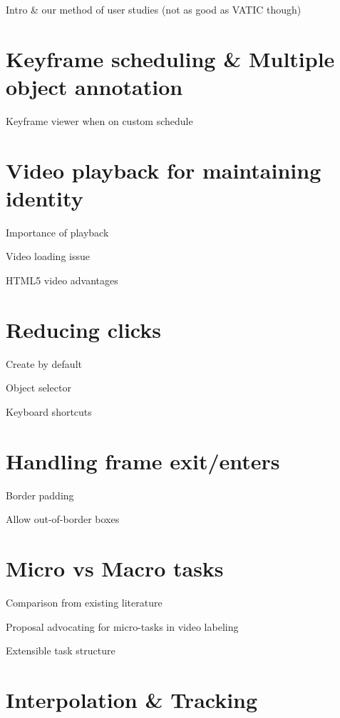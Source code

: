 
Intro \& our method of user studies (not as good as VATIC though)

\section{Keyframe scheduling \& Multiple object annotation}

Keyframe viewer when on custom schedule

\section{Video playback for maintaining identity}

Importance of playback

Video loading issue

HTML5 video advantages

\section{Reducing clicks}

Create by default

Object selector

Keyboard shortcuts

\section{Handling frame exit/enters}

Border padding

Allow out-of-border boxes

\section{Micro vs Macro tasks}

Comparison from existing literature

Proposal advocating for micro-tasks in video labeling

Extensible task structure

\section{Interpolation \& Tracking}
